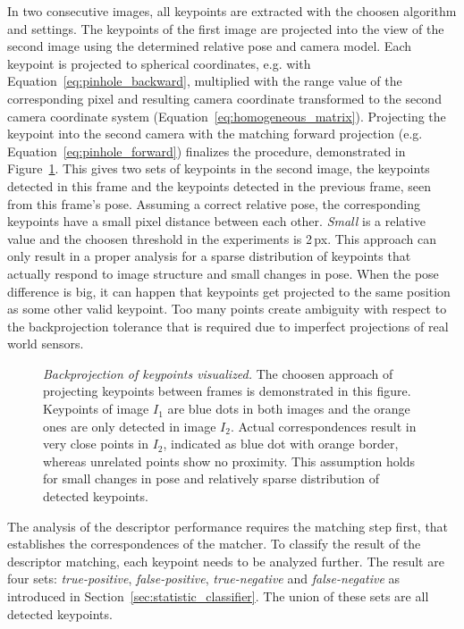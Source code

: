 In two consecutive images, all keypoints are extracted with the choosen algorithm and settings.
The keypoints of the first image are projected into the view of the second image using the determined relative pose and camera model.
Each keypoint is projected to spherical coordinates, e.g. with Equation~\ref{eq:pinhole_backward}, multiplied with the range value of the corresponding pixel and resulting camera coordinate transformed to the second camera coordinate system (Equation~\ref{eq:homogeneous_matrix}).
Projecting the keypoint into the second camera with the matching forward projection (e.g. Equation~\ref{eq:pinhole_forward}) finalizes the procedure, demonstrated in Figure~\ref{fig:keypoint_projection}.
This gives two sets of keypoints in the second image, the keypoints detected in this frame and the keypoints detected in the previous frame, seen from this frame's pose.
Assuming a correct relative pose, the corresponding keypoints have a small pixel distance between each other.
\emph{Small} is a relative value and the choosen threshold in the experiments is 2\,px.
This approach can only result in a proper analysis for a sparse distribution of keypoints that actually respond to image structure and small changes in pose.
When the pose difference is big, it can happen that keypoints get projected to the same position as some other valid keypoint.
Too many points create ambiguity with respect to the backprojection tolerance that is required due to imperfect projections of real world sensors.
\begin{figure}[H]
    
    \caption[Backprojection of keypoints visualized]{\emph{Backprojection of keypoints visualized.} The choosen approach of projecting keypoints between frames is demonstrated in this figure. Keypoints of image $I_1$ are blue dots in both images and the orange ones are only detected in image $I_2$. Actual correspondences result in very close points in $I_2$, indicated as blue dot with orange border, whereas unrelated points show no proximity. This assumption holds for small changes in pose and relatively sparse distribution of detected keypoints.}\label{fig:keypoint_projection}
\end{figure}
\pagebreak[4]
The analysis of the descriptor performance requires the matching step first, that establishes the correspondences of the matcher.
To classify the result of the descriptor matching, each keypoint needs to be analyzed further.
The result are four sets: \emph{true-positive}, \emph{false-positive}, \emph{true-negative} and \emph{false-negative} as introduced in Section~\ref{sec:statistic_classifier}.
The union of these sets are all detected keypoints.

